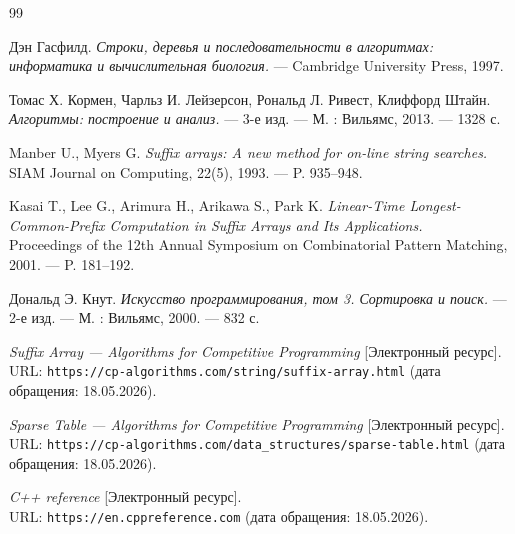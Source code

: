 \begin{thebibliography}{99}

    Дэн Гасфилд.
    {\itshape Строки, деревья и последовательности в алгоритмах: информатика и вычислительная биология.}
    --- Cambridge University Press, 1997. 
    
    Томас Х. Кормен, Чарльз И. Лейзерсон, Рональд Л. Ривест, Клиффорд Штайн.
    {\itshape Алгоритмы: построение и анализ.}
    --- 3-е изд. --- М. : Вильямс, 2013. --- 1328 с.
    
    Manber U., Myers G.
    {\itshape Suffix arrays: A new method for on-line string searches.} \\
    SIAM Journal on Computing, 22(5), 1993. --- P. 935--948.
    
    Kasai T., Lee G., Arimura H., Arikawa S., Park K.
    {\itshape Linear-Time Longest-Common-Prefix Computation in Suffix Arrays and Its Applications.} \\
    Proceedings of the 12th Annual Symposium on Combinatorial Pattern Matching, 2001. --- P. 181--192.
    
    Дональд Э. Кнут.
    {\itshape Искусство программирования, том 3. Сортировка и поиск.}
    --- 2-е изд. --- М. : Вильямс, 2000. --- 832 с.
    
    {\itshape Suffix Array --- Algorithms for Competitive Programming} [Электронный ресурс]. \\
    URL: \texttt{https://cp-algorithms.com/string/suffix-array.html} 
    (дата обращения: 18.05.2026).
    
    {\itshape Sparse Table --- Algorithms for Competitive Programming} [Электронный ресурс]. \\
    URL: \texttt{https://cp-algorithms.com/data\_structures/sparse-table.html} 
    (дата обращения: 18.05.2026).
    
    {\itshape C++ reference} [Электронный ресурс]. \\
    URL: \texttt{https://en.cppreference.com} 
    (дата обращения: 18.05.2026).

\end{thebibliography}